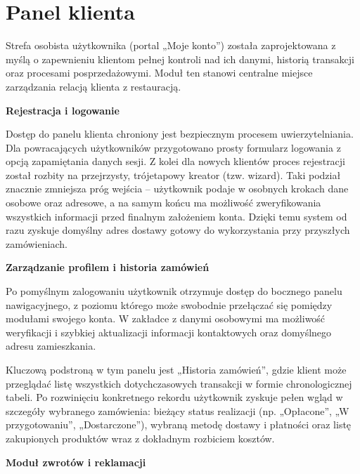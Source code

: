 \newpage

\section{Panel klienta}

Strefa osobista użytkownika (portal „Moje konto”) została zaprojektowana z myślą o zapewnieniu klientom pełnej kontroli nad ich danymi, historią transakcji oraz procesami posprzedażowymi. Moduł ten stanowi centralne miejsce zarządzania relacją klienta z restauracją.

\vspace{10pt}
\textbf{Rejestracja i logowanie}
\vspace{5pt}

Dostęp do panelu klienta chroniony jest bezpiecznym procesem uwierzytelniania. Dla powracających użytkowników przygotowano prosty formularz logowania z opcją zapamiętania danych sesji. Z kolei dla nowych klientów proces rejestracji został rozbity na przejrzysty, trójetapowy kreator (tzw. wizard). Taki podział znacznie zmniejsza próg wejścia – użytkownik podaje w osobnych krokach dane osobowe oraz adresowe, a na samym końcu ma możliwość zweryfikowania wszystkich informacji przed finalnym założeniem konta. Dzięki temu system od razu zyskuje domyślny adres dostawy gotowy do wykorzystania przy przyszłych zamówieniach.

\vspace{10pt}
\textbf{Zarządzanie profilem i historia zamówień}
\vspace{5pt}

Po pomyślnym zalogowaniu użytkownik otrzymuje dostęp do bocznego panelu nawigacyjnego, z poziomu którego może swobodnie przełączać się pomiędzy modułami swojego konta. W zakładce z danymi osobowymi ma możliwość weryfikacji i szybkiej aktualizacji informacji kontaktowych oraz domyślnego adresu zamieszkania. 

Kluczową podstroną w tym panelu jest „Historia zamówień”, gdzie klient może przeglądać listę wszystkich dotychczasowych transakcji w formie chronologicznej tabeli. Po rozwinięciu konkretnego rekordu użytkownik zyskuje pełen wgląd w szczegóły wybranego zamówienia: bieżący status realizacji (np. „Opłacone”, „W przygotowaniu”, „Dostarczone”), wybraną metodę dostawy i płatności oraz listę zakupionych produktów wraz z dokładnym rozbiciem kosztów.

\vspace{10pt}
\textbf{Moduł zwrotów i reklamacji}
\vspace{5pt}

